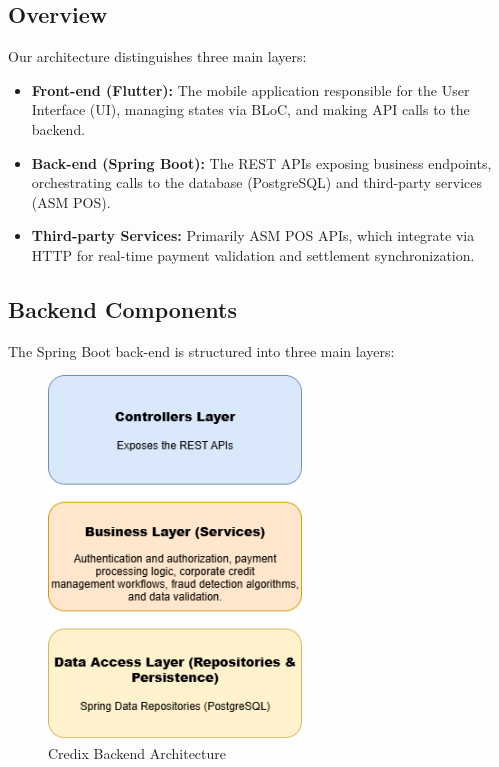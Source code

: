 \subsection{Overview}
Our architecture distinguishes three main layers:

\begin{itemize}
    \item \textbf{Front-end (Flutter):} The mobile application responsible for the User Interface (UI), managing states via BLoC, and making API calls to the backend.
    \item \textbf{Back-end (Spring Boot):} The REST APIs exposing business endpoints, orchestrating calls to the database (PostgreSQL) and third-party services (ASM POS).
    \item \textbf{Third-party Services:} Primarily ASM POS APIs, which integrate via HTTP for real-time payment validation and settlement synchronization.
\end{itemize}

\subsection{Backend Components}

The Spring Boot back-end is structured into three main layers:

\begin{figure}[H]
    \centering
    \includegraphics[width=0.6\textwidth]{images/backend_architecture_diagram.png}
    \caption{Credix Backend Architecture}
    \label{fig:backend_architecture}
\end{figure}

